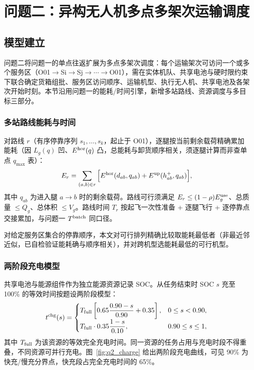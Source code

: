 \section{问题二：异构无人机多点多架次运输调度}

\subsection{模型建立}

问题二将问题一的单点往返扩展为多点多架次调度：每个运输架次可访问一个或多个服务区（O01$\to$Si$\to$Sj$\to\cdots\to$O01），需在实体机队、共享电池与硬时限约束下联合确定货箱组批、服务区访问顺序、运输机型、执行无人机、共享电池及各架次开始时刻。本节沿用问题一的能耗/时间引擎，新增多站路线、资源调度与多目标三部分。

\subsubsection{多站路线能耗与时间}

对路线 $r$（有序停靠序列 $s_1,\dots,s_k$，起止于 O01），逐腿按当前剩余载荷精确累加能耗（因 $L_g(q)$ 凹、$E^{\rm hor}(q)$ 凸，总能耗与卸货顺序相关，须逐腿计算而非查单点 $q_{\max}$ 表）：
\begin{equation}
E_r = \sum_{(a,b)\in r}\Big[E^{\rm hor}(d_{ab}, q_{ab}) + E^{\rm up}(h^{+}_{ab}, q_{ab})\Big],
\end{equation}
其中 $q_{ab}$ 为进入腿 $a\to b$ 时的剩余载荷。路线可行须满足 $E_r\le(1-\rho)E^{\rm use}_g$、总质量 $\le Q_g$、总体积 $\le V_g$。路线时间 $T_r$ 按起飞一次性准备 + 逐腿飞行 + 逐停靠点交接累加，与问题一 $T^{\rm batch}$ 同口径。

对给定服务区集合的停靠顺序，本文对可行排列精确比较取能耗最低者（非最近邻近似，已自检验证能耗确与顺序相关），并对跨机型选能耗最低的可行机型。

\subsubsection{两阶段充电模型}

共享电池与能源组件作为独立能源资源记录 SOC。从任务结束时 SOC $s$ 充至 100\% 的等效时间按题设两阶段模型\cite{ref_ti}：
\begin{equation}
t^{\rm chg}(s)=
\begin{cases}
T_{\rm full}\left[0.65\dfrac{0.90-s}{0.90}+0.35\right], & 0\le s<0.90,\\[6pt]
T_{\rm full}\cdot 0.35\dfrac{1-s}{0.10}, & 0.90\le s\le 1,
\end{cases}
\end{equation}
其中 $T_{\rm full}$ 为该资源的等效完全充电时间。同一资源的任务占用与充电时段不得重叠，不同资源可并行充电。图~\ref{fig:q2_charge} 给出两阶段充电曲线，可见 90\% 为快充/慢充分界点，快充段占完全充电时间的 65\%。

